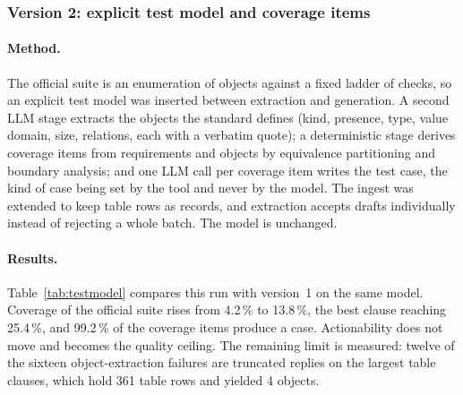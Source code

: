 \subsubsection{Version 2: explicit test model and coverage items}
\label{sec:exp-testmodel}

\paragraph{Method.}
The official suite is an enumeration of objects against a fixed ladder of
checks, so an explicit test model was inserted between extraction and
generation. A second LLM stage extracts the objects the standard defines
(kind, presence, type, value domain, size, relations, each with a verbatim
quote); a deterministic stage derives coverage items from requirements and
objects by equivalence partitioning and boundary analysis; and one LLM call
per coverage item writes the test case, the kind of case being set by the tool
and never by the model. The ingest was extended to keep table rows as records,
and extraction accepts drafts individually instead of rejecting a whole batch.
The model is unchanged.

\paragraph{Results.}
Table~\ref{tab:testmodel} compares this run with version~1 on the same
model. Coverage of the official suite rises from 4.2\,\% to 13.8\,\%, the
best clause reaching 25.4\,\%, and 99.2\,\% of the coverage items produce a
case. Actionability does not move and becomes the quality ceiling. The
remaining limit is measured: twelve of the sixteen object-extraction failures
are truncated replies on the largest table clauses, which hold 361 table rows
and yielded 4 objects.

